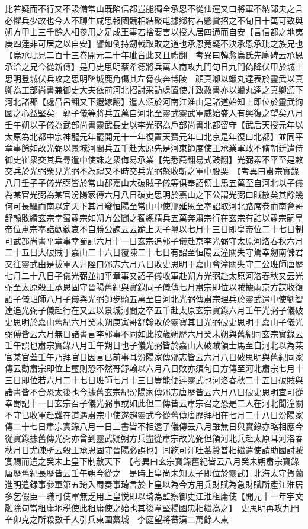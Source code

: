 比若疑而不行又不設備常山既陷信都豈能獨全承恩不從仙運又曰將軍不納鄙夫之言必懼兵少故也今人不聊生咸思報國競相結聚屯據鄉村若懸賞招之不旬日十萬可致與朔方甲士三千餘人相參用之足成王事若捨要害以授人居四通而自安【言信都之地夷庚四逹非可居之以自安】譬如倒持劒戟取敗之道也承恩竟疑不決承恩承玼之族兄也【烏承玼見二百十三卷開元二十年玼音此又且禮翻　考異曰韓愈烏氏先廟碑云承恩承洽之兄今從新傳】是月史思明蔡希德將兵萬人南攻九門旬日九門偽降伏甲於城上思明登城伏兵攻之思明墜城鹿角傷其左脅夜奔博陵　顔真卿以蠟丸達表於靈武以真卿為工部尚書兼御史大夫依前河北招討采訪處置使并致赦書亦以蠟丸達之真卿頒下河北諸郡【處昌呂翻又下遐嫁翻】遣人頒於河南江淮由是諸道始知上即位於靈武徇國之心益堅矣　郭子儀等將兵五萬自河北至靈武靈武軍威始盛人有興復之望矣八月壬午朔以子儀為武部尚書靈武長史以李光弼為戶部尚書北都留守【武后天授元年以太原為北都中宗神龍元年罷開元十一年復置天寶元年曰北京是年復曰北都】並同平章事餘如故光弼以景城河間兵五千赴太原先是河東節度使王承業軍政不脩朝廷遣侍御史崔衆交其兵尋遣中使誅之衆侮易承業【先悉薦翻易式豉翻】光弼素不平至是敕交兵於光弼衆見光弼不為禮又不時交兵光弼怒收斬之軍中股栗　【考異曰肅宗實錄八月壬子子儀光弼皆於常山郡嘉山大破賊子儀等俱奉詔領士馬五萬至自河北以子儀為某官光弼為某官汾陽家傳六月八日破史思明於嘉山之下公謂光弼曰賊散矣其餘幾何可長驅而南以定天下其月發恒陽至常山中使邢延恩至奉詔取河北路席卷而南會哥舒翰敗績玄宗幸蜀肅宗如朔方公聞之獨總精兵五萬奔肅宗行在玄宗有誥以肅宗嗣皇帝位肅宗奉誥歔欷哀不自勝公諫云云跪上天子璽以七月十三日即皇帝位二十七日制可武部尚書平章事幸蜀記六月十一日玄宗追郭子儀赴京李光弼守太原河洛春秋六月二十五日大破賊于嘉山二十六日覆陳二十七日有詔至恒陽云潼關失守駕幸劒南儲君又往靈武由是拔軍入井陘口邠志六月八日敗史思明于嘉山會潼關失守二公班師唐歷七月二十八日子儀光弼並加平章事又詔子儀收軍赴朔方光弼赴太原河洛春秋又云光弼至太原殺王承恩固守晉陽舊紀與實錄同子儀傳七月肅宗即位以賊據兩京方謀收復詔子儀班師八月子儀與光弼帥步騎五萬至自河北光弼傳肅宗理兵於靈武遣中使劉智達追光弼子儀赴行在又云以景城河間之卒五千赴太原玄宗實錄六月壬午光弼子儀破史思明於嘉山舊紀六月癸未朔庚寅哥舒翰敗於靈寶其日光弼破史思明于嘉山子儀光弼傅皆云六月無日諸書言李郭事不同如此按歲朔歷六月癸未朔與舊紀同玄宗實錄云壬午誤也肅宗實錄八月壬午朔日也子儀光弼皆於嘉山大破賊領士馬至自河北以為某官某官蓋壬午乃拜官日因言已前事耳汾陽家傳邠志皆云六月八日破思明與舊紀同家傳云勸肅宗即位上璽則恐不然哥舒翰以六月八日敗亦須旬日方傳至河北肅宗七月十三日即位若六月二十七日班師七月十三日豈能便逹靈武也河洛春秋二十五日破賊與諸書皆不合恐太後也今據舊玄宗紀汾陽家傳邠志唐歷皆云六月八日破史思明宜可從幸蜀記十一日玄宗召子儀光弼事或如此但二傳皆云肅宗召之恐是二人在河北聞潼關不守已收軍赴難在道遇肅宗中使遂趨靈武今從舊傳唐歷拜相在七月二十八日汾陽家傳二十七日肅宗實錄八月一日三書皆不相遠子儀傳云八月雖無日與實錄亦略相應今從實錄據舊傳光弼亦曾到靈武疑朔方兵盡從肅宗故光弼但領河北兵赴太原耳河洛春秋月日尤疎所云殺王承恩固守晉陽必誤也】囘紇可汗吐蕃贊普相繼遣使請助國討賊宴賜而遣之癸未上皇下制赦天下　【考異曰玄宗寶錄舊紀皆云八月癸未朔肅宗寶錄唐歷舊紀長歷皆云壬午朔今從之　是時上皇尚未知太子即位於靈武】北海太守賀蘭進明遣録事參軍第五琦入蜀奏事琦言於上皇以為今方用兵財賦為急財賦所產江淮居多乞假臣一職可使軍無乏用上皇悦即以琦為監察御史江淮租庸使【開元十一年宇文融除句當租庸地税使此租庸使之始也其後韋堅楊國忠相繼為之】　史思明再攻九門辛卯克之所殺數千人引兵東圍藁城　李庭望將蕃漢二萬餘人東